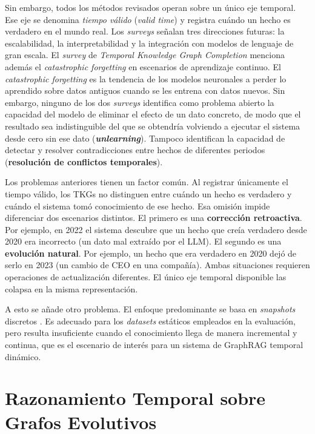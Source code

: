 Sin embargo, todos los métodos revisados operan sobre un único eje temporal. Ese eje se denomina \emph{tiempo válido} (\emph{valid time}) \cite{tkg_survey2024, tkgc_survey2023} y registra cuándo un hecho es verdadero en el mundo real. Los \emph{surveys} \cite{tkg_survey2024, tkgc_survey2023} señalan tres direcciones futuras: la escalabilidad, la interpretabilidad y la integración con modelos de lenguaje de gran escala. El \emph{survey} de \emph{Temporal Knowledge Graph Completion} \cite{tkgc_survey2023} menciona además el \emph{catastrophic forgetting} en escenarios de aprendizaje continuo. El \emph{catastrophic forgetting} es la tendencia de los modelos neuronales a perder lo aprendido sobre datos antiguos cuando se les entrena con datos nuevos. Sin embargo, ninguno de los dos \emph{surveys} identifica como problema abierto la capacidad del modelo de eliminar el efecto de un dato concreto, de modo que el resultado sea indistinguible del que se obtendría volviendo a ejecutar el sistema desde cero sin ese dato (\textbf{\emph{unlearning}}). Tampoco identifican la capacidad de detectar y resolver contradicciones entre hechos de diferentes periodos (\textbf{resolución de conflictos temporales}).

Los problemas anteriores tienen un factor común. Al registrar únicamente el tiempo válido, los TKGs no distinguen entre cuándo un hecho es verdadero y cuándo el sistema tomó conocimiento de ese hecho. Esa omisión impide diferenciar dos escenarios distintos. El primero es una \textbf{corrección retroactiva}. Por ejemplo, en 2022 el sistema descubre que un hecho que creía verdadero desde 2020 era incorrecto (un dato mal extraído por el LLM). El segundo es una \textbf{evolución natural}. Por ejemplo, un hecho que era verdadero en 2020 dejó de serlo en 2023 (un cambio de CEO en una compañía). Ambas situaciones requieren operaciones de actualización diferentes. El único eje temporal disponible las colapsa en la misma representación.

A esto se añade otro problema. El enfoque predominante se basa en \emph{snapshots} discretos \cite{tkg_survey2024}. Es adecuado para los \emph{datasets} estáticos empleados en la evaluación, pero resulta insuficiente cuando el conocimiento llega de manera incremental y continua, que es el escenario de interés para un sistema de GraphRAG temporal dinámico.

\section{Razonamiento Temporal sobre Grafos Evolutivos}\label{sec:temporal-reasoning}

